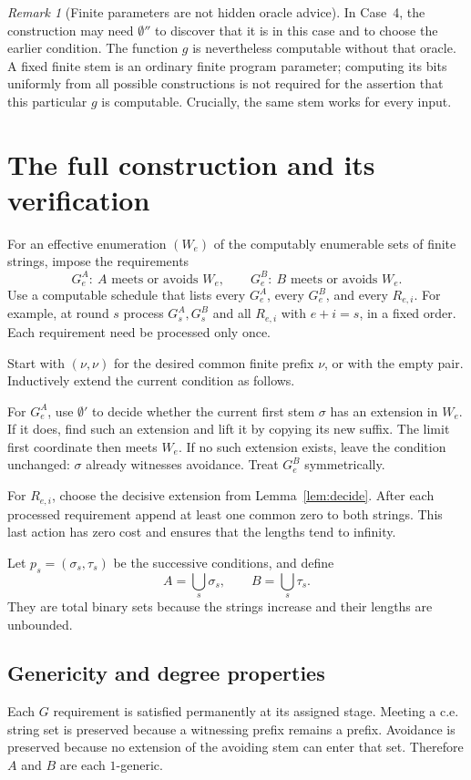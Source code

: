 \documentclass[11pt,a4paper]{article}
\theoremstyle{definition}
\theoremstyle{remark}
\newtheorem{remark}[theorem]{Remark}
\begin{document}
\begin{remark}[Finite parameters are not hidden oracle advice]
In Case~4, the construction may need $\emptyset''$ to discover that it is in this case and to choose the earlier condition. The function $g$ is nevertheless computable without that oracle. A fixed finite stem is an ordinary finite program parameter; computing its bits uniformly from all possible constructions is not required for the assertion that this particular $g$ is computable. Crucially, the same stem works for every input.
\end{remark}

\section{The full construction and its verification}\label{sec:construction}
For an effective enumeration $(W_e)$ of the computably enumerable sets of finite strings, impose the requirements
\[
G_e^A:\ A\text{ meets or avoids }W_e,\qquad
G_e^B:\ B\text{ meets or avoids }W_e.
\]
Use a computable schedule that lists every $G_e^A$, every $G_e^B$, and every $R_{e,i}$. For example, at round $s$ process $G_s^A,G_s^B$ and all $R_{e,i}$ with $e+i=s$, in a fixed order. Each requirement need be processed only once.

Start with $(\nu,\nu)$ for the desired common finite prefix $\nu$, or with the empty pair. Inductively extend the current condition as follows.

For $G_e^A$, use $\emptyset'$ to decide whether the current first stem $\sigma$ has an extension in $W_e$. If it does, find such an extension and lift it by copying its new suffix. The limit first coordinate then meets $W_e$. If no such extension exists, leave the condition unchanged: $\sigma$ already witnesses avoidance. Treat $G_e^B$ symmetrically.

For $R_{e,i}$, choose the decisive extension from Lemma~\ref{lem:decide}. After each processed requirement append at least one common zero to both strings. This last action has zero cost and ensures that the lengths tend to infinity.

Let $p_s=(\sigma_s,\tau_s)$ be the successive conditions, and define
\[
A=\bigcup_s\sigma_s,\qquad B=\bigcup_s\tau_s.
\]
They are total binary sets because the strings increase and their lengths are unbounded.

\subsection{Genericity and degree properties}
Each $G$ requirement is satisfied permanently at its assigned stage. Meeting a c.e. string set is preserved because a witnessing prefix remains a prefix. Avoidance is preserved because no extension of the avoiding stem can enter that set. Therefore $A$ and $B$ are each $1$-generic.
\end{document}
